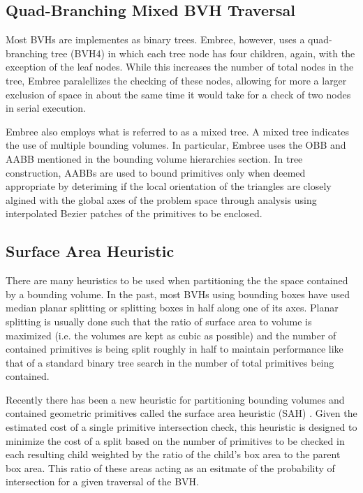 \documentclass{anstrans}
\begin{document}
\subsection{Quad-Branching Mixed BVH Traversal}

Most BVHs are implementes as binary trees. Embree, however, uses a quad-branching tree (BVH4) in which each tree node has four children, again, with the exception of the leaf nodes. While this increases the number of total nodes in the tree, Embree paralellizes the checking of these nodes, allowing for more a larger exclusion of space in about the same time it would take for a check of two nodes in serial execution. 

Embree also employs what is referred to as a mixed tree. A mixed tree indicates the use of multiple bounding volumes. In particular, Embree uses the OBB and AABB mentioned in the bounding volume hierarchies section. In tree construction, AABBs are used to bound primitives only when deemed appropriate by deteriming if the local orientation of the triangles are closely algined with the global axes of the problem space through analysis using interpolated Bezier patches of the primitives to be enclosed.

\subsection{Surface Area Heuristic}

There are many heuristics to be used when partitioning the the space contained by a bounding volume. In the past, most BVHs using bounding boxes have used median planar splitting or splitting boxes in half along one of its axes. Planar splitting is usually done such that the ratio of surface area to volume is maximized (i.e. the volumes are kept as cubic as possible) and the number of contained primitives is being split roughly in half to maintain performance like that of a standard binary tree search in the number of total primitives being contained. 

Recently there has been a new heuristic for partitioning bounding volumes and contained geometric primitives called the surface area heuristic (SAH) \cite{sah}. Given the estimated cost of a single primitive intersection check, this heuristic is designed to minimize the cost of a split based on the number of primitives to be checked in each resulting child weighted by the ratio of the child's box area to the parent box area. This ratio of these areas acting as an esitmate of the probability of intersection for a given traversal of the BVH.
\end{document}
